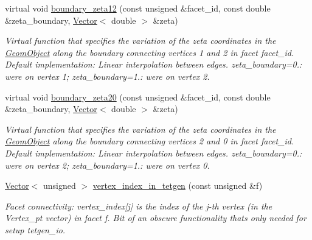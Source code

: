 \begin{DoxyCompactItemize}
virtual void \hyperlink{classoomph_1_1TetMeshFacetedSurface_a7dd49826326e9926d92fc773853a9afb}{boundary\+\_\+zeta12} (const unsigned \&facet\+\_\+id, const double \&zeta\+\_\+boundary, \hyperlink{classoomph_1_1Vector}{Vector}$<$ double $>$ \&zeta)
\begin{DoxyCompactList}\small\item\em Virtual function that specifies the variation of the zeta coordinates in the \hyperlink{classoomph_1_1GeomObject}{Geom\+Object} along the boundary connecting vertices 1 and 2 in facet facet\+\_\+id. Default implementation\+: Linear interpolation between edges. zeta\+\_\+boundary=0.\+: we\textquotesingle{}re on vertex 1; zeta\+\_\+boundary=1.\+: we\textquotesingle{}re on vertex 2. \end{DoxyCompactList}\item 
virtual void \hyperlink{classoomph_1_1TetMeshFacetedSurface_aa9c92e3c5ba628cdcc91086c9cb38c22}{boundary\+\_\+zeta20} (const unsigned \&facet\+\_\+id, const double \&zeta\+\_\+boundary, \hyperlink{classoomph_1_1Vector}{Vector}$<$ double $>$ \&zeta)
\begin{DoxyCompactList}\small\item\em Virtual function that specifies the variation of the zeta coordinates in the \hyperlink{classoomph_1_1GeomObject}{Geom\+Object} along the boundary connecting vertices 2 and 0 in facet facet\+\_\+id. Default implementation\+: Linear interpolation between edges. zeta\+\_\+boundary=0.\+: we\textquotesingle{}re on vertex 2; zeta\+\_\+boundary=1.\+: we\textquotesingle{}re on vertex 0. \end{DoxyCompactList}\item 
\hyperlink{classoomph_1_1Vector}{Vector}$<$ unsigned $>$ \hyperlink{classoomph_1_1TetMeshFacetedSurface_a931ad8f6d1da646d06341e1c09a3d242}{vertex\+\_\+index\+\_\+in\+\_\+tetgen} (const unsigned \&f)
\begin{DoxyCompactList}\small\item\em Facet connectivity\+: vertex\+\_\+index\mbox{[}j\mbox{]} is the index of the j-\/th vertex (in the Vertex\+\_\+pt vector) in facet f. Bit of an obscure functionality that\textquotesingle{}s only needed for setup tetgen\+\_\+io. \end{DoxyCompactList}\end{DoxyCompactItemize}

